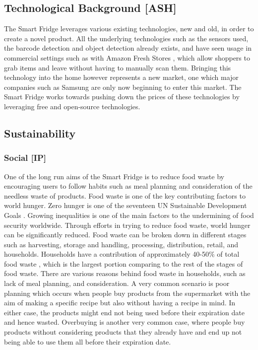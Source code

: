 \subsection{Technological Background [ASH]}
The Smart Fridge leverages various existing technologies, new and old, in order to create a novel product.
All the underlying technologies such as the sensors used, the barcode detection and object detection already exists, and have seen usage in commercial settings such as with Amazon Fresh Stores \cite{fresh},
which allow shoppers to grab items and leave without having to manually scan them.
Bringing this technology into the home however represents a new market,
one which major companies such as Samsung \cite{samsung} are only now beginning to enter this market.
The Smart Fridge works towards pushing down the prices of these technologies by leveraging free and open-source technologies.

\subsection{Sustainability}

\subsubsection{Social [IP]}

One of the long run aims of the Smart Fridge is to reduce food waste by encouraging users to follow habits such as meal planning and consideration of the needless waste of products.
Food waste is one of the key contributing factors to world hunger.
Zero hunger is one of the seventeen UN Sustainable Development Goals \cite{UNGoals}.
Growing inequalities is one of the main factors to the undermining of food security worldwide.
Through efforts in trying to reduce food waste, world hunger can be significantly reduced.
Food waste can be broken down in different stages such as harvesting, storage and handling, processing, distribution, retail, and households.
Households have a contribution of approximately 40-50\% of total food waste \cite{FoodWasteStages}, which is the largest portion comparing to the rest of the stages of food waste.
There are various reasons behind food waste in households, such as lack of meal planning, and consideration.
A very common scenario is poor planning which occurs when people buy products from the supermarket with the aim of making a specific recipe but also without having a recipe in mind.
In either case, the products might end not being used before their expiration date and hence wasted.
Overbuying is another very common case, where people buy products without considering products that they already have and end up not being able to use them all before their expiration date.

